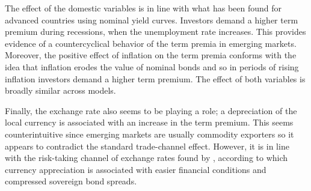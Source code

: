 The effect of the domestic variables is in line with what has been found for advanced countries using nominal yield curves. Investors demand a higher term premium during recessions, when the unemployment rate increases. This provides evidence of a countercyclical behavior of the term premia in emerging markets. Moreover, the positive effect of inflation on the term premia conforms with the idea that inflation erodes the value of nominal bonds and so in periods of rising inflation investors demand a higher term premium. The effect of both variables is broadly similar across models. 

Finally, the exchange rate also seems to be playing a role; a depreciation of the local currency is associated with an increase in the term premium. This seems counterintuitive since emerging markets are usually commodity exporters so it appears to contradict the standard trade-channel effect. However, it is in line with the risk-taking channel of exchange rates found by \cite{HofmannShimShin:2017}, according to which currency appreciation is associated with easier financial conditions and compressed sovereign bond spreads.

